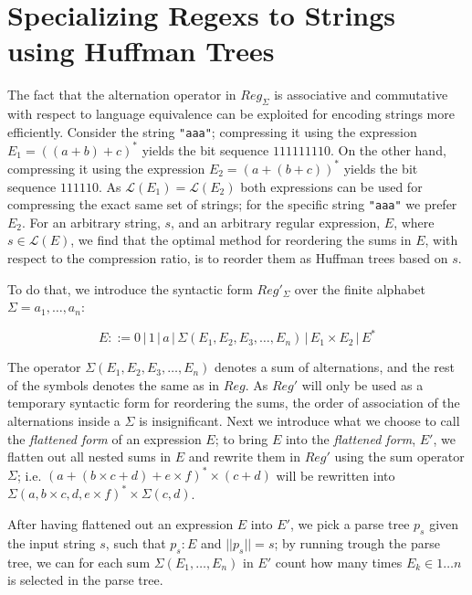\documentclass[a4paper, oneside]{memoir}
\theoremstyle{definition}
\begin{document}
\section{Specializing Regexs to Strings using Huffman Trees}\label{sec:huffman}
\label{sec:specialize_huffman}

The fact that the alternation operator in $Reg_{\Sigma}$ is associative and commutative with respect to language equivalence can be exploited for encoding strings more efficiently. Consider the string \texttt{"aaa"}; compressing it using the expression $E_1 = ((a + b) + c)^{*}$ yields the bit sequence $111111110$. On the other hand, compressing it using the expression $E_2 = (a + (b + c))^{*}$ yields the bit sequence $111110$. As $\mathcal{L}(E_1) = \mathcal{L}(E_2)$ both expressions can be used for compressing the exact same set of strings; for the specific string \texttt{"aaa"} we prefer $E_2$. For an arbitrary string, $s$, and an arbitrary regular expression, $E$, where $s \in \mathcal{L}(E)$, we find that the optimal method for reordering the sums in $E$, with respect to the compression ratio, is to reorder them as Huffman trees based on $s$.

To do that, we introduce the syntactic form $Reg'_\Sigma$ over the finite alphabet $\Sigma = {a_1, \dots, a_n}$:

\[
    E ::= 0 \, | \, 1 \, | \, a \, | \, \Sigma(E_1, E_2, E_3, \dots, E_n) \, | \, E_1 \times E_2 \, | \, E^{*}
\]

The operator $\Sigma(E_1, E_2, E_3, \dots, E_n)$ denotes a sum of alternations, and the rest of the symbols denotes the same as in $Reg$. As $Reg'$ will only be used as a temporary syntactic form for reordering the sums, the order of association of the alternations inside a $\Sigma$ is insignificant.
Next we introduce what we choose to call the \emph{flattened form} of an expression $E$; to bring $E$ into the \emph{flattened form}, $E'$, we flatten out all nested sums in $E$ and rewrite them in $Reg'$ using the sum operator $\Sigma$; i.e. $(a + (b \times c + d) + e \times f)^{*} \times (c + d)$ will be rewritten into $\Sigma(a, b \times c, d, e \times f)^{*} \times \Sigma{(c, d)}$.

After having flattened out an expression $E$ into $E'$, we pick a parse tree $p_s$ given the input string $s$, such that $p_s : E$ and $||p_s|| = s$; by running trough the parse tree, we can for each sum $\Sigma(E_1, \dots, E_n)$ in $E'$ count how many times $E_k \in 1 \dots n$ is selected in the parse tree.
\end{document}
